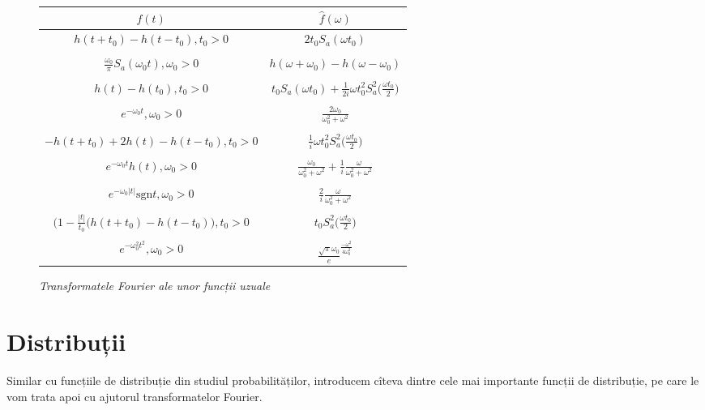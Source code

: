 \documentclass[12pt,a4paper]{article}
\theoremstyle{dotless}
\theoremstyle{dotlessdr}
\begin{document}
\begin{figure}[!htbp]
  \centering
  \begin{tabular}{| c | c |}
    $ f(t) $ & $ \widehat{f}(\omega) $ \\
    \hline \hline
    $ h(t + t_0) - h(t - t_0), t_0 > 0 $ & $ 2t_0 S_a(\omega t_0) $ \\ & \\
    $ \frac{\omega_0}{\pi} S_a(\omega_0 t), \omega_0 > 0 $ & $ h(\omega + \omega_0) - h(\omega - \omega_0) $ \\ & \\
    $ h(t) - h(t_0), t_0 > 0 $ & $ t_0 S_a(\omega t_0) + \frac{1}{2i} \omega t_0^2 S_a^2 \Big( \frac{\omega t_0}{2} \Big) $\\ & \\
    $ e^{-\omega_0 t}, \omega_0 > 0 $ & $ \frac{2 \omega_0}{\omega_0^2 + \omega^2} $ \\ & \\
    $ -h(t + t_0) + 2h(t) - h(t - t_0), t_0 > 0 $ & $ \frac{1}{i} \omega t_0^2 S_a^2\Big( \frac{\omega t_0}{2} \Big) $ \\ & \\
    $ e^{-\omega_0 t} h(t), \omega_0 > 0 $ & $ \frac{\omega_0}{\omega_0^2 + \omega^2} + \frac{1}{i} \frac{\omega}{\omega_0^2 + \omega^2} $ \\ & \\
    $ e^{-\omega_0 |t|} \mathrm{sgn} t, \omega_0 > 0 $ & $ \frac{2}{i} \frac{\omega}{\omega_0^2 + \omega^2} $ \\ & \\
    $ \Big( 1 - \frac{|t|}{t_0} (h(t + t_0) - h(t - t_0)\Big), t_0 > 0 $ & $ t_0 S_a^2 \Big( \frac{\omega t_0}{2} \Big) $ \\ & \\
    $ e^{-\omega_0^2 t^2}, \omega_0 > 0 $ & $ \frac{\sqrt{\pi}{\omega_0}} e^{\frac{-\omega^2}{4 \omega_0^2}} $
  \end{tabular}
  \caption{\emph{Transformatele Fourier ale unor funcții uzuale}}
  \label{fig:tabel-f}
\end{figure}


\section*{Distribuții}

\indent\indent Similar cu funcțiile de distribuție din studiul probabilităților,
introducem cîteva dintre cele mai importante funcții de distribuție, pe care le vom
trata apoi cu ajutorul transformatelor Fourier.
\end{document}
